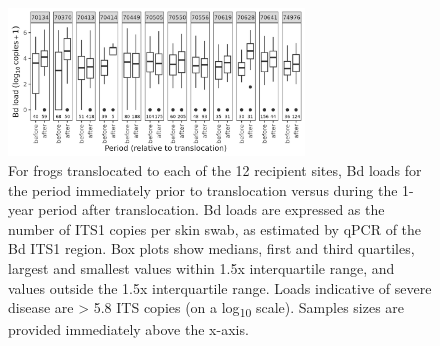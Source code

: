 \documentclass[9pt,twoside,lineno]{pnas-new}
\begin{document}
\begin{figure}

{\centering \includegraphics[width=0.7\textwidth]{figures/bdload_beforeafter.png}

}

\caption{\label{fig-bdload-beforeafter}For frogs translocated to each of
the 12 recipient sites, Bd loads for the period immediately prior to
translocation versus during the 1-year period after translocation. Bd
loads are expressed as the number of ITS1 copies per skin swab, as
estimated by qPCR of the Bd ITS1 region. Box plots show medians, first
and third quartiles, largest and smallest values within 1.5x
interquartile range, and values outside the 1.5x interquartile range.
Loads indicative of severe disease are \textgreater{} 5.8 ITS copies (on
a log\textsubscript{10} scale). Samples sizes are provided immediately
above the x-axis.}

\end{figure}\clearpage

\newpage
\end{document}
